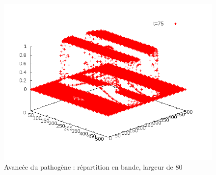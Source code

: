 \documentclass{article}
\begin{document}
\begin{figure}[!h]
	\includegraphics[scale=0.25]{img/anim1-80-150.png}
\caption{Avancée du pathogène : répartition en bande, largeur de 80}
\label{fig2}
\end{figure}
\end{document}
